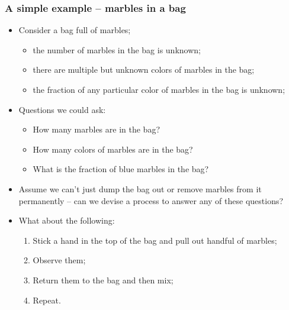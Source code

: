 \documentclass[aspectratio=169]{beamer}
\theoremstyle{principle}
\begin{document}
\begin{frame}
\frametitle{A simple example -- marbles in a bag}

\begin{itemize}
\item Consider a bag full of marbles;
\begin{itemize}
\item the number of marbles in the bag is unknown;
\item there are multiple but unknown colors of marbles in the bag;
\item the fraction of any particular color of marbles in the bag is unknown;
\end{itemize}
\bigskip
\item Questions we could ask:
\begin{itemize}
\item How many marbles are in the bag?
\item How many colors of marbles are in the bag?
\item What is the fraction of blue marbles in the bag?
\end{itemize}
\bigskip
\item Assume we can't just dump the bag out or remove marbles from it permanently -- can we devise a process to answer any of these questions?
\bigskip
\item[]\color{white} What about the following:
\begin{enumerate}
\item[]\color{white} Stick a hand in the top of the bag and pull out handful of marbles;
\item[]\color{white} Observe them;
\item[]\color{white} Return them to the bag and then mix;
\item[]\color{white} Repeat.
\end{enumerate} 

\end{itemize}

\end{frame}
\end{document}
